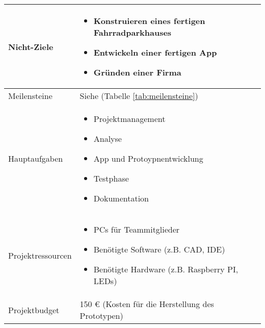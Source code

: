 \begin{longtable}{p{}|p{}}
  Nicht-Ziele           &
  \begin{itemize}
    \item Konstruieren eines fertigen Fahrradparkhauses
    \item Entwickeln einer fertigen App
    \item Gründen einer Firma
  \end{itemize}                                                                     \\  \midrule

  Meilensteine          & Siehe \nameref{tab:meilensteine} (Tabelle \ref{tab:meilensteine})                              \\ \midrule

  Hauptaufgaben         &
  \begin{itemize}
    \item Projektmanagement
    \item Analyse
    \item App und Protoypnentwicklung
    \item Testphase
    \item Dokumentation
  \end{itemize}                                                                                       \\  \midrule

  Projektressourcen     &
  \begin{itemize}
    \item PCs für Teammitglieder
    \item Benötigte Software (z.B. \ac{CAD}, \ac{IDE})
    \item Benötigte Hardware (z.B. Raspberry PI, LEDs)
  \end{itemize}                                                                      \\  \midrule

  Projektbudget         & 150 \euro{} (Kosten für die Herstellung des Prototypen)                                        \\ \midrule


\end{longtable}

